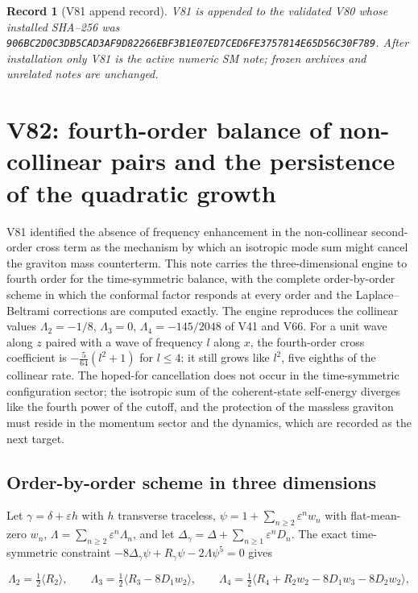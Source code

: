 \documentclass[11pt]{article}
\newtheorem{record}[theorem]{Record}
\theoremstyle{remark}
\begin{document}
\begin{record}[V81 append record]
\label{rec:v19v81}
V81 is appended to the validated V80 whose installed SHA--256 was
\texttt{906BC2D0C3DB5CAD3AF9D82266EBF3B1E07ED7CED6FE3757814E65D56C30F789}.
After installation only V81 is the active numeric SM note; frozen
archives and unrelated notes are unchanged.
\end{record}


\section{V82: fourth-order balance of non-collinear pairs and the persistence of the quadratic growth}
\label{sec:v19v82}

V81 identified the absence of frequency enhancement in the
non-collinear second-order cross term as the mechanism by which an
isotropic mode sum might cancel the graviton mass counterterm.  This
note carries the three-dimensional engine to fourth order for the
time-symmetric balance, with the complete order-by-order scheme in
which the conformal factor responds at every order and the
Laplace--Beltrami corrections are computed exactly.  The engine
reproduces the collinear values \(\Lambda_2=-1/8\), \(\Lambda_3=0\),
\(\Lambda_4=-145/2048\) of V41 and V66.  For a unit wave along \(z\)
paired with a wave of frequency \(l\) along \(x\), the fourth-order
cross coefficient is \(-\tfrac5{64}(l^2+1)\) for \(l\leq4\): it still
grows like \(l^2\), five eighths of the collinear rate.  The hoped-for
cancellation does not occur in the time-symmetric configuration
sector; the isotropic sum of the coherent-state self-energy diverges
like the fourth power of the cutoff, and the protection of the massless
graviton must reside in the momentum sector and the dynamics, which
are recorded as the next target.

\subsection{Order-by-order scheme in three dimensions}

Let \(\gamma=\delta+\varepsilon h\) with \(h\) transverse traceless,
\(\psi=1+\sum_{n\geq2}\varepsilon^nw_n\) with flat-mean-zero \(w_n\),
\(\Lambda=\sum_{n\geq2}\varepsilon^n\Lambda_n\), and let
\(\Delta_\gamma=\Delta+\sum_{n\geq1}\varepsilon^nD_n\).  The exact
time-symmetric constraint \(-8\Delta_\gamma\psi+R_\gamma\psi-2\Lambda\psi^5=0\)
gives

\[
 \Lambda_2=\tfrac12\langle R_2\rangle,\qquad
 \Lambda_3=\tfrac12\langle R_3-8D_1w_2\rangle,\qquad
 \Lambda_4=\tfrac12\langle R_4+R_2w_2-8D_1w_3-8D_2w_2\rangle,           \tag{85.1}
\]
\end{document}
